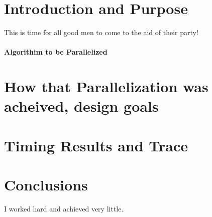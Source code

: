 \documentclass[12pt]{article}
\begin{document}
\maketitle

\section{Introduction and Purpose}
This is time for all good men to come to the aid of their party!

\paragraph{Algorithim to be Parallelized}

\section{How that Parallelization was acheived, design goals}

\section{Timing Results and Trace}

\section{Conclusions}
I worked hard and achieved very little.
\end{document}
